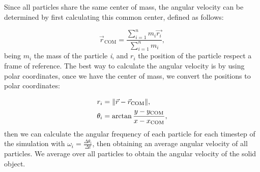 Since all particles share the same center of mass, the angular velocity can be determined by first calculating this common center, defined as follows:

\begin{equation}
  \vec{r}_{\mathrm{COM}}= \displaystyle\frac{\sum^{n}_{i=1} m_i\vec{r_i}}{\sum^{n}_{i=1} m_i},
  \label{eq:centerofmass}
\end{equation}
being $m_i$ the mass of the particle \textit{i}, and $r_i$ the position of the particle respect a frame of reference. The best way to calculate the angular velocity is by using polar coordinates, once we have the center of mass, we convert the positions to polar coordinates:

\begin{align}
  r_i &= \norm{\vec{r} - \vec{r}_{\mathrm{COM}}},\\ 
  \theta _i &= \arctan{\frac{y - y_{\mathrm{COM}}}{x - x_{\mathrm{COM}}}},
\end{align}
then we can calculate the angular frequency of each particle for each timestep of the simulation with $\omega _i = \frac{\Delta \theta _i}{\Delta t}$, then obtaining an average angular velocity of all particles. We average over all particles to obtain the angular velocity of the solid object.

